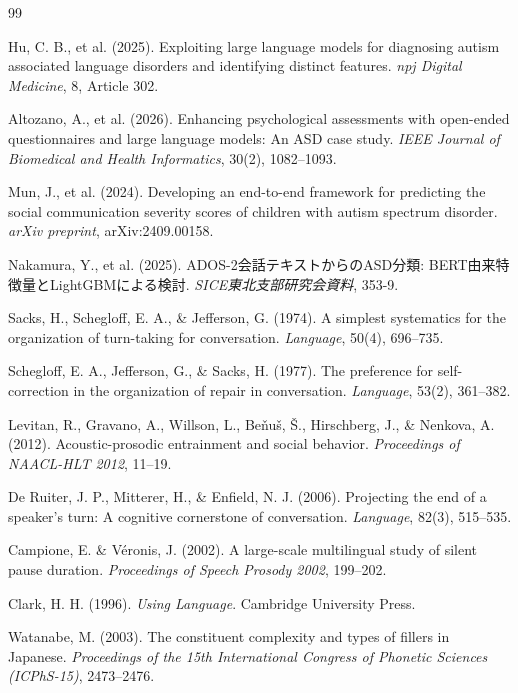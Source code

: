 \documentclass[dvipdfmx,11pt,a4paper]{bxjsarticle}
\begin{document}
\begin{thebibliography}{99}

Hu, C. B., et al. (2025).
Exploiting large language models for diagnosing autism associated language disorders and identifying distinct features.
\textit{npj Digital Medicine}, 8, Article 302.

Altozano, A., et al. (2026).
Enhancing psychological assessments with open-ended questionnaires and large language models: An ASD case study.
\textit{IEEE Journal of Biomedical and Health Informatics}, 30(2), 1082--1093.

Mun, J., et al. (2024).
Developing an end-to-end framework for predicting the social communication severity scores of children with autism spectrum disorder.
\textit{arXiv preprint}, arXiv:2409.00158.

Nakamura, Y., et al. (2025).
ADOS-2会話テキストからのASD分類: BERT由来特徴量とLightGBMによる検討.
\textit{SICE東北支部研究会資料}, 353-9.

Sacks, H., Schegloff, E. A., \& Jefferson, G. (1974).
A simplest systematics for the organization of turn-taking for conversation.
\textit{Language}, 50(4), 696--735.

Schegloff, E. A., Jefferson, G., \& Sacks, H. (1977).
The preference for self-correction in the organization of repair in conversation.
\textit{Language}, 53(2), 361--382.

Levitan, R., Gravano, A., Willson, L., Beňuš, Š., Hirschberg, J., \& Nenkova, A. (2012).
Acoustic-prosodic entrainment and social behavior.
\textit{Proceedings of NAACL-HLT 2012}, 11--19.

De Ruiter, J. P., Mitterer, H., \& Enfield, N. J. (2006).
Projecting the end of a speaker's turn: A cognitive cornerstone of conversation.
\textit{Language}, 82(3), 515--535.

Campione, E. \& Véronis, J. (2002).
A large-scale multilingual study of silent pause duration.
\textit{Proceedings of Speech Prosody 2002}, 199--202.

Clark, H. H. (1996).
\textit{Using Language}.
Cambridge University Press.

Watanabe, M. (2003).
The constituent complexity and types of fillers in Japanese.
\textit{Proceedings of the 15th International Congress of Phonetic Sciences (ICPhS-15)}, 2473--2476.


\end{thebibliography}
\end{document}
